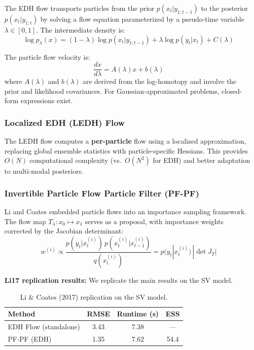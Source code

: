 \documentclass[12pt,a4paper]{article}
\theoremstyle{definition}
\theoremstyle{remark}
\begin{document}
The EDH flow \citep{daum2010} transports particles from the prior $p(x_t | y_{1:t-1})$ to the posterior $p(x_t | y_{1:t})$ by solving a flow equation parameterized by a pseudo-time variable $\lambda \in [0, 1]$. The intermediate density is:
\begin{equation}
	\log p_\lambda(x) = (1 - \lambda) \log p(x_t | y_{1:t-1}) + \lambda \log p(y_t | x_t) + C(\lambda)
\end{equation}

The particle flow velocity is:
\begin{equation}
	\frac{dx}{d\lambda} = A(\lambda) x + b(\lambda)
\end{equation}
where $A(\lambda)$ and $b(\lambda)$ are derived from the log-homotopy and involve the prior and likelihood covariances. For Gaussian-approximated problems, closed-form expressions exist.

\subsubsection{Localized EDH (LEDH) Flow}

The LEDH flow \citep{daum2011} computes a \textbf{per-particle} flow using a localized approximation, replacing global ensemble statistics with particle-specific Hessians. This provides $O(N)$ computational complexity (vs.\ $O(N^2)$ for EDH) and better adaptation to multi-modal posteriors.

\subsubsection{Invertible Particle Flow Particle Filter (PF-PF)}

Li and Coates \citep{li2017} embedded particle flows into an importance sampling framework. The flow map $T_\lambda: x_0 \mapsto x_1$ serves as a proposal, with importance weights corrected by the Jacobian determinant:
\begin{equation}
	w^{(i)} \propto \frac{p(y_t | x_t^{(i)}) \, p(x_t^{(i)} | x_{t-1}^{(i)})}{q(x_t^{(i)})} = p(y_t | x_t^{(i)}) \, |\det J_T|
\end{equation}

\textbf{Li17 replication results:} We replicate the main results on the SV model.

\begin{table}[H]
	\centering
	\caption{Li \& Coates (2017) replication on the SV model.}
	\label{tab:li17}
	\begin{tabular}{@{}lccc@{}}
		\toprule
		\textbf{Method} & \textbf{RMSE} & \textbf{Runtime (s)} & \textbf{ESS} \\
		\midrule
		EDH Flow (standalone) & 3.43 & 7.38 & --- \\
		PF-PF (EDH) & 1.35 & 7.62 & 54.4 \\
		\bottomrule
	\end{tabular}
\end{table}
\end{document}
